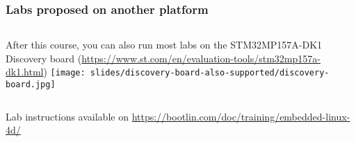 \begin{frame}
\frametitle{Labs proposed on another platform}
  \begin{columns}
    After this course, you can also run most labs on the STM32MP157A-DK1 Discovery board
    (\url{https://www.st.com/en/evaluation-tools/stm32mp157a-dk1.html})
    \texttt{[image: slides/discovery-board-also-supported/discovery-board.jpg]}
  \end{columns}
  \vspace{1cm}
  Lab instructions available on
  \url{https://bootlin.com/doc/training/embedded-linux-4d/}
\end{frame}
